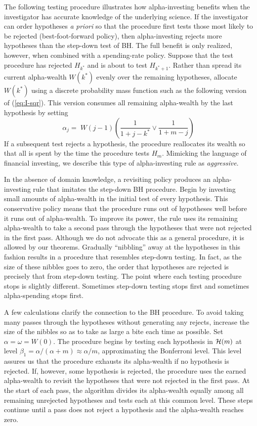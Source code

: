 \documentclass[12pt]{article}
\newcommand{\al}{\alpha}
\newcommand{\eqn}[1]{(\ref{#1})}
\begin{document}
The following testing procedure illustrates how alpha-investing benefits when
 the investigator has accurate knowledge of the underlying science. 
 If the investigator can order
 hypotheses {\it a priori} so that the procedure first tests those most likely to
 be rejected (best-foot-forward policy), then
 alpha-investing rejects more hypotheses than the step-down 
 test of BH.  The full benefit is only realized, 
 however, when combined with a spending-rate policy. 
Suppose that the test procedure has rejected $H_{k^{*}}$ and is about to
test $H_{k^{*}+1}$.  Rather than spread its current alpha-wealth
$W(k^{*})$ evenly over the remaining hypotheses,  allocate
$W(k^{*})$ using a discrete probability mass function such as the following
version of  \eqn{eq:I-sqr}.  This version consumes all remaining alpha-wealth by the
last hypothesis by setting
\begin{equation}
\alpha_j =  \;W(j-1)\left(\frac{1}{1 + j-k^{*}} \vee \frac{1}{1 + m - j}\right)
\label{eq:aggressive}
\end{equation}
If a subsequent test rejects a hypothesis, the procedure reallocates
 its wealth so that all is spent by the time the procedure tests
 $H_m$.  Mimicking the language of financial investing, we describe
 this type of alpha-investing rule as {\it aggressive}.
 
 
In the absence of domain knowledge, a revisiting policy produces an 
 alpha-investing rule that imitates the step-down BH procedure. Begin
 by investing small amounts of alpha-wealth in the initial test of
 every hypothesis.  This conservative policy means that the procedure
 runs out of hypotheses well before it runs out of alpha-wealth.  To
 improve its power, the rule uses its remaining alpha-wealth to
 take a second pass through the hypotheses that were not rejected in
 the first pass.  Although we do not advocate this as a general
 procedure, it is allowed by our theorems.  Gradually ``nibbling''
 away at the hypotheses in this fashion results in a procedure that resembles
  step-down testing.  In fact, as the size of
 these nibbles goes to zero, the order that hypotheses are rejected is
 precisely that from step-down testing.  The point where each testing procedure
 stops is slightly different.  Sometimes step-down testing stops first and
 sometimes alpha-spending stops first.

A few calculations clarify the connection to the BH procedure. To avoid taking many passes through the hypotheses without generating
 any rejects, increase the size of the nibbles so as to take as large a bite each time
 as possible.  Set $\alpha = \omega = W(0)$.  The
 procedure begins by testing each hypothesis in ${\cal H}(m)$ at level
 $\beta_{1} = \al/(\al + m) \approx \al/m$, approximating the
 Bonferroni level.  This  level assures us that the
 procedure exhausts its alpha-wealth if no hypothesis is
 rejected.  If, however, some hypothesis is rejected, the procedure
 uses the earned alpha-wealth to revisit the hypotheses that were not
 rejected in the first pass.  At the start of each pass, the algorithm
 divides its alpha-wealth equally among all remaining unrejected hypotheses
 and tests each at this common level.  These steps continue 
 until a pass  does not reject a hypothesis and the 
 alpha-wealth reaches zero. 
 
\end{document}
